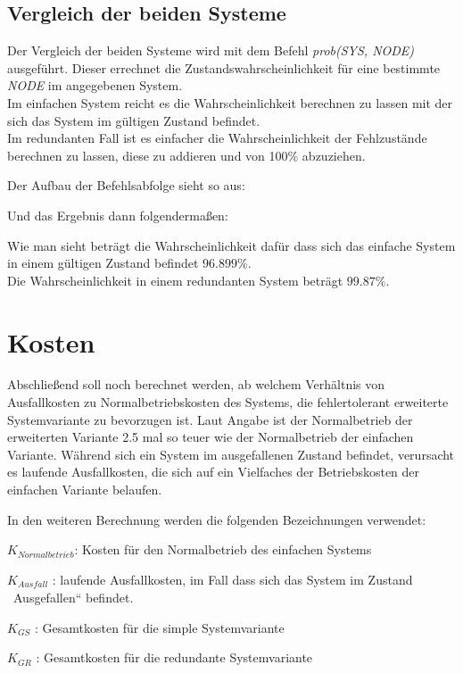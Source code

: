 \documentclass[10pt,a4paper]{article}
\begin{document}
\subsection{Vergleich der beiden Systeme}
\label{subsec:avail_res}
Der Vergleich der beiden Systeme wird mit dem Befehl \textit{prob(SYS, NODE)} ausgeführt. Dieser errechnet die Zustandswahrscheinlichkeit für eine bestimmte \textit{NODE} im angegebenen System.\\
Im einfachen System reicht es die Wahrscheinlichkeit berechnen zu lassen mit der sich das System im gültigen Zustand befindet. \\
Im redundanten Fall ist es einfacher die Wahrscheinlichkeit der Fehlzustände berechnen zu lassen, diese zu addieren und von 100\% abzuziehen.

Der Aufbau der Befehlsabfolge sieht so aus:

\newpage
Und das Ergebnis dann folgendermaßen:

Wie man sieht beträgt die Wahrscheinlichkeit dafür dass sich das einfache System in einem gültigen Zustand befindet $96.899\%$. \\
Die Wahrscheinlichkeit in einem redundanten System beträgt $99.87\%$.
\section{Kosten}
\label{sec:cost}
Abschlie{\ss}end soll noch berechnet werden, ab welchem Verh\"altnis von
Ausfallkosten zu Normalbetriebskosten des Systems, die fehlertolerant
erweiterte Systemvariante zu bevorzugen ist. Laut Angabe ist der Normalbetrieb der erweiterten Variante 2.5 mal
so teuer wie der Normalbetrieb der einfachen Variante. W\"ahrend sich ein System
im ausgefallenen Zustand befindet, verursacht es laufende
Ausfallkosten, die sich auf ein Vielfaches der Betriebskosten der einfachen Variante belaufen.


\bigskip

In den weiteren Berechnung werden die folgenden Bezeichnungen verwendet:


\bigskip

 $K_{\mathit{Normalbetrieb}}$: Kosten f\"ur den Normalbetrieb des
einfachen Systems

 $K_{\mathit{Ausfall}}$ : laufende Ausfallkosten, im Fall dass sich das
System im Zustand \ {\quotedblbase}Ausgefallen{\textquotedblleft}
befindet.

 $K_{\mathit{GS}}$ : Gesamtkosten f\"ur die simple Systemvariante

 $K_{\mathit{GR}}$ : Gesamtkosten f\"ur die redundante Systemvariante
\end{document}
